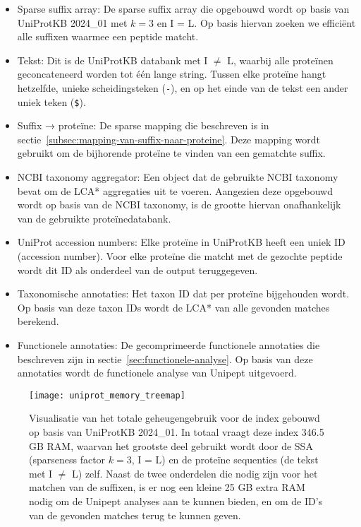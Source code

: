 \begin{itemize}
    \item Sparse suffix array: De sparse suffix array die opgebouwd wordt op basis van UniProtKB 2024\_01 met $k = 3$ en I = L\@.
    Op basis hiervan zoeken we efficiënt alle suffixen waarmee een peptide matcht.
    \item Tekst: Dit is de UniProtKB databank met I $\neq$ L, waarbij alle proteïnen geconcateneerd worden tot één lange string.
    Tussen elke proteïne hangt hetzelfde, unieke scheidingsteken (\texttt{-}), en op het einde van de tekst een ander uniek teken (\texttt{\$}).
    \item Suffix → proteïne: De sparse mapping die beschreven is in sectie~\ref{subsec:mapping-van-suffix-naar-proteine}.
    Deze mapping wordt gebruikt om de bijhorende proteïne te vinden van een gematchte suffix.
    \item NCBI taxonomy aggregator: Een object dat de gebruikte NCBI taxonomy bevat om de LCA* aggregaties uit te voeren.
    Aangezien deze opgebouwd wordt op basis van de NCBI taxonomy, is de grootte hiervan onafhankelijk van de gebruikte proteïnedatabank.
    \item UniProt accession numbers: Elke proteïne in UniProtKB heeft een uniek ID (accession number).
    Voor elke proteïne die matcht met de gezochte peptide wordt dit ID als onderdeel van de output teruggegeven.
    \item Taxonomische annotaties: Het taxon ID dat per proteïne bijgehouden wordt.
    Op basis van deze taxon IDs wordt de LCA* van alle gevonden matches berekend.
    \item Functionele annotaties: De gecomprimeerde functionele annotaties die beschreven zijn in sectie~\ref{sec:functionele-analyse}.
    Op basis van deze annotaties wordt de functionele analyse van Unipept uitgevoerd.
\end{itemize}

\begin{figure}[h]
    \centering
    \texttt{[image: uniprot\_memory\_treemap]}
    \caption{Visualisatie van het totale geheugengebruik voor de index gebouwd op basis van UniProtKB 2024\_01.
    In totaal vraagt deze index 346.5 GB RAM, waarvan het grootste deel gebruikt wordt door de SSA (sparseness factor $k = 3$, I = L) en de proteïne sequenties (de tekst met I $\neq$ L) zelf.
    Naast de twee onderdelen die nodig zijn voor het matchen van de suffixen, is er nog een kleine 25 GB extra RAM nodig om de Unipept analyses aan te kunnen bieden, en om de ID's van de gevonden matches terug te kunnen geven.}
    \label{fig:uniprot_memory_treemap}
\end{figure}
\newpage
